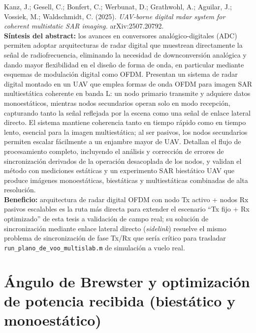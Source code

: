 \documentclass[11pt,a4paper]{article}
\begin{document}
\begin{enumerate}[label=\textbf{[D\arabic*]}, leftmargin=2.2cm, itemsep=10pt]
\item Kanz, J.; Gesell, C.; Bonfert, C.; Werbunat, D.; Grathwohl, A.;
Aguilar, J.; Vossiek, M.; Waldschmidt, C. (2025). \textit{UAV-borne digital
radar system for coherent multistatic SAR imaging.} arXiv:2507.20792.
\cite{kanz2025}\\
\textbf{Síntesis del abstract:} los avances en conversores
analógico-digitales (ADC) permiten adoptar arquitecturas de radar digital
que muestrean directamente la señal de radiofrecuencia, eliminando la
necesidad de downconversión analógica y dando mayor flexibilidad en el
diseño de forma de onda, en particular mediante esquemas de modulación
digital como OFDM. Presentan un sistema de radar digital montado en un UAV
que emplea formas de onda OFDM para imagen SAR multiestática coherente en
banda L: un nodo primario transmite y adquiere datos monoestáticos,
mientras nodos secundarios operan solo en modo recepción, capturando tanto
la señal reflejada por la escena como una señal de enlace lateral directo.
El sistema mantiene coherencia tanto en tiempo rápido como en tiempo lento,
esencial para la imagen multiestática; al ser pasivos, los nodos
secundarios permiten escalar fácilmente a un enjambre mayor de UAV.
Detallan el flujo de procesamiento completo, incluyendo el análisis y
corrección de errores de sincronización derivados de la operación
desacoplada de los nodos, y validan el método con mediciones estáticas y
un experimento SAR biestático UAV que produce imágenes monoestáticas,
biestáticas y multiestáticas combinadas de alta resolución.\\
\textbf{Beneficio:} arquitectura de radar digital OFDM con nodo Tx activo +
nodos Rx pasivos escalables es la ruta más directa para extender el
escenario ``Tx fijo + Rx optimizado'' de esta tesis a validación de campo
real; su solución de sincronización mediante enlace lateral directo
(\emph{sidelink}) resuelve el mismo problema de sincronización de fase
Tx/Rx que sería crítico para trasladar
\texttt{run\_plano\_de\_voo\_multislab.m} de simulación a vuelo real.

\end{enumerate}

\section{Ángulo de Brewster y optimización de potencia recibida (biestático y monoestático)}
\label{sec:brewster}
\end{document}
